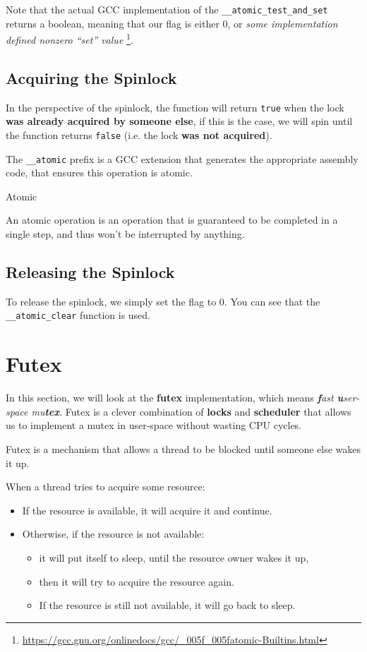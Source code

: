 Note that the actual GCC implementation of the \texttt{\_\_atomic\_test\_and\_set} returns a
boolean, meaning that our flag is either 0, or \textit{some implementation defined nonzero ``set'' value}
\footnote{\url{https://gcc.gnu.org/onlinedocs/gcc/_005f_005fatomic-Builtins.html}}.

\subsection{Acquiring the Spinlock}

In the perspective of the spinlock, the function will return \texttt{true} when the lock
\textbf{was already acquired by someone else}, if this is the case, we will spin until the
function returns \texttt{false} (i.e. the lock \textbf{was not acquired}).

The \texttt{\_\_atomic} prefix is a GCC extension that generates the appropriate assembly code,
that ensures this operation is atomic.

\begin{note*}{Atomic}
    \item An atomic operation is an operation that is guaranteed to be completed in a single step,
    and thus won't be interrupted by anything.
\end{note*}

\subsection{Releasing the Spinlock}

To release the spinlock, we simply set the flag to 0. You can see that the \texttt{\_\_atomic\_clear}
function is used.

\section{Futex}

In this section, we will look at the \textbf{futex} implementation, which means
\textit{\textbf{f}ast \textbf{u}ser-space mu\textbf{tex}}. Futex is a clever combination
of \textbf{locks} and \textbf{scheduler} that allows us to implement a mutex in user-space
without wasting CPU cycles.

Futex is a mechanism that allows a thread to be blocked until someone else wakes it up.

When a thread tries to acquire some resource:

\begin{itemize}
    \item If the resource is available, it will acquire it and continue.
    \item Otherwise, if the resource is not available:
          \begin{itemize}
              \item it will put itself to sleep, until the resource owner wakes it up,
              \item then it will try to acquire the resource again.
              \item If the resource is still not available, it will go back to sleep.
          \end{itemize}
\end{itemize}

